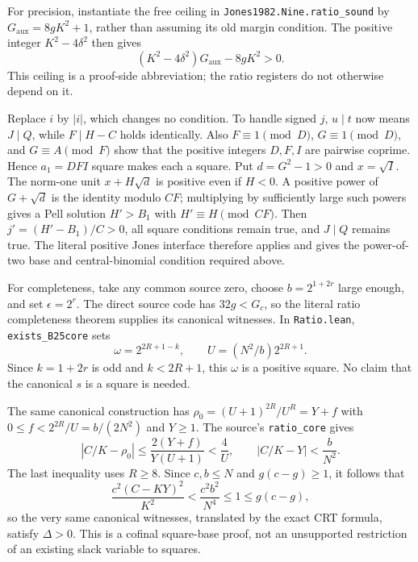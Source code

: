 For precision, instantiate the free ceiling in
\texttt{Jones1982.Nine.ratio\_sound} by
$G_{\mathrm{aux}}=8gK^2+1$, rather than assuming its old margin condition.
The positive integer $K^2-4\delta^2$ then gives
\[
 (K^2-4\delta^2)G_{\mathrm{aux}}-8gK^2>0.
\]
This ceiling is a proof-side abbreviation; the ratio registers do not
otherwise depend on it.

Replace $i$ by $|i|$, which changes no condition. To handle signed $j$,
$u\mid t$ now means $J\mid Q$, while $F\mid H-C$ holds identically. Also
$F\equiv1\pmod D$, $G\equiv1\pmod D$, and $G\equiv A\pmod F$ show
that the positive integers $D,F,I$ are pairwise coprime.
Hence $a_1=DFI$ square makes each a square. Put $d=G^2-1>0$ and
$x=\sqrt I$. The norm-one unit $x+H\sqrt d$ is positive even if $H<0$.
A positive power of $G+\sqrt d$ is the identity modulo $CF$; multiplying by
sufficiently large such powers gives a Pell solution $H'>B_1$ with
$H'\equiv H\pmod{CF}$. Then $j'=(H'-B_1)/C>0$, all square conditions
remain true, and $J\mid Q$ remains true. The literal positive Jones interface
therefore applies and gives the power-of-two base and central-binomial
condition required above.

For completeness, take any common source zero, choose
$b=2^{1+2r}$ large enough, and set $\epsilon=2^r$. The direct source code
has $32g<G_c$, so the literal ratio completeness theorem supplies its
canonical witnesses. In \texttt{Ratio.lean}, \texttt{exists\_B25core} sets
\[
 \omega=2^{2R+1-k},\qquad U=(N^2/b)2^{2R+1}.
\]
Since $k=1+2r$ is odd and $k<2R+1$, this $\omega$ is a positive square.
No claim that the canonical $s$ is a square is needed.

The same canonical construction has
$\rho_0=(U+1)^{2R}/U^R=Y+f$ with
$0\le f<2^{2R}/U=b/(2N^2)$ and $Y\ge1$.
The source's \texttt{ratio\_core} gives
\[
 |C/K-\rho_0|\le\frac{2(Y+f)}{Y(U+1)}<\frac4U,
 \qquad |C/K-Y|<\frac b{N^2}.
\]
The last inequality uses $R\ge8$. Since $c,b\le N$ and
$g(c-g)\ge1$, it follows that
\[
 \frac{c^2(C-KY)^2}{K^2}<\frac{c^2b^2}{N^4}\le1\le g(c-g),
\]
so the very same canonical witnesses, translated by the exact CRT formula, satisfy $\Delta>0$.
This is a cofinal square-base proof, not an unsupported restriction of an
existing slack variable to squares.

